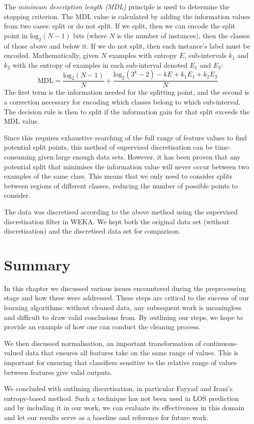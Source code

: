 The \textit{minimum description length (MDL)} principle is used to determine
the stopping criterion. The MDL value is calculated by adding the information
values from two cases: split or do not split. If we split, then we can encode
the split point in $\mathrm{log}_2(N-1)$ bits (where $N$ is the number of
instances), then the classes of those above and below it. If we do not split,
then each instance's label must be encoded. Mathematically, given $N$ examples
with entropy $E$, sub-intervals $k_1$ and $k_2$ with the entropy of examples
in each sub-interval denoted $E_1$ and $E_2$:
\begin{equation*}
\mathrm{MDL} = \dfrac{\mathrm{log}_2(N-1)}{N} + \dfrac{\mathrm{log}_2(3^k-2) - kE + k_1E_1 + k_2E_2}{N}
\end{equation*}
The first term is the information needed for the splitting point, and the
second is a correction necessary for encoding which classes belong to which
sub-interval. The decision rule is then to split if the information gain for
that split exceeds the MDL value.

Since this requires exhaustive searching of the full range of feature values
to find potential split points, this method of supervised discretisation can
be time-consuming given large enough data sets. However, it has been proven
that any potential split that minimises the information value will never occur
between two examples of the same class. This means that we only need to
consider splits between regions of different classes, reducing the number of
possible points to consider.

The data was discretised according to the above method using the supervised
discretisation filter in WEKA. We kept both the original data set (without
discretisation) and the discretised data set for comparison.

\section{Summary}
In this chapter we discussed various issues encountered during the
preprocessing stage and how these were addressed. These steps are critical to
the success of our learning algorithms: without cleaned data, any subsequent
work is meaningless and difficult to draw valid conclusions from. By outlining
our steps, we hope to provide an example of how one can conduct the cleaning
process.

We then discussed normalisation, an important transformation of
continuous-valued data that ensures all features take on the same range of
values. This is important for ensuring that classifiers sensitive to the
relative range of values between features give valid outputs.

We concluded with outlining discretisation, in particular Fayyad and Irani's
entropy-based method. Such a technique has not been used in LOS prediction
and by including it in our work, we can evaluate its effectiveness in this
domain and let our results serve as a baseline and reference for future work.
